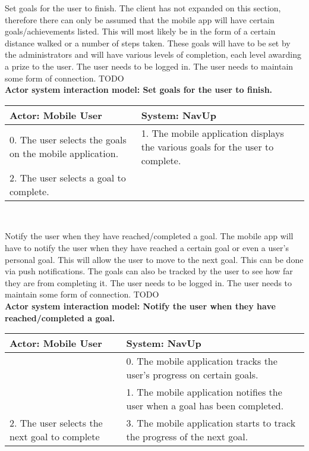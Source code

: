 \FuncReq
{Set goals for the user to finish.}
{The client has not expanded on this section, therefore there can only be assumed that the mobile app will have certain goals/achievements listed. This will most likely be in the form of a certain distance walked or a number of steps taken. These goals will have to be set by the administrators and will have various levels of completion, each level awarding a prize to the user.}
{The user needs to be logged in.
The user needs to maintain some form of connection.}
{TODO}
\\
\textbf{Actor system interaction model: Set goals for the user to finish.}\\
\begin{tabular}{ | p{6cm} | p{6cm} |}
\hline
Actor: Mobile User & System: NavUp \\ \hline
0. The user selects the goals on the mobile application. & 1. The mobile application displays the various goals for the user to complete.\\ \hline
2. The user selects a goal to complete. &\\ \hline
\end{tabular}
\\
\bigskip

\FuncReq
{Notify the user when they have reached/completed a goal.}
{The mobile app will have to notify the user when they have reached a certain goal or even a user's personal goal. This will allow the user to move to the next goal. This can be done via push notifications. The goals can also be tracked by the user to see how far they are from completing it.}
{The user needs to be logged in.
The user needs to maintain some form of connection.}
{TODO}
\\
\textbf{Actor system interaction model: Notify the user when they have reached/completed a goal.}\\
\begin{tabular}{ | p{6cm} | p{6cm} |}
\hline
Actor: Mobile User & System: NavUp \\ \hline
& 0. The mobile application tracks the user's progress on certain goals.\\ \hline
& 1. The mobile application notifies the user when a goal has been completed.\\ \hline
2. The user selects the next goal to complete & 3. The mobile application starts to track the progress of the next goal.\\ \hline
\end{tabular}
\\
\bigskip

